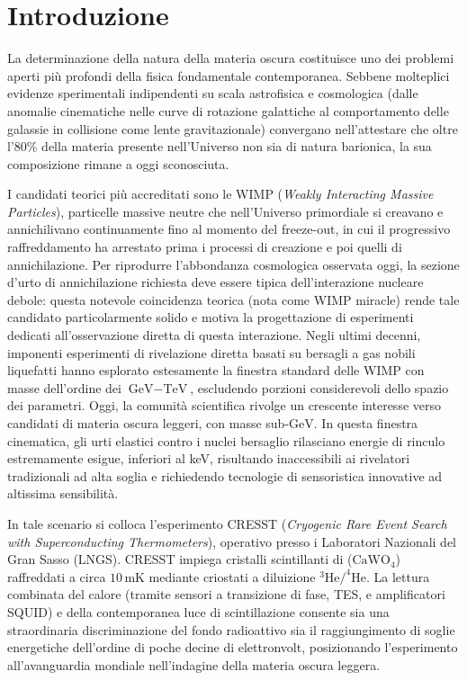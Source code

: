 \chapter*{Introduzione}

La determinazione della natura della materia oscura costituisce uno dei problemi aperti più profondi della fisica fondamentale contemporanea. Sebbene molteplici evidenze sperimentali indipendenti su scala astrofisica e cosmologica (dalle anomalie cinematiche nelle curve di rotazione galattiche al comportamento delle galassie in collisione come lente gravitazionale) convergano nell'attestare che oltre l'80\% della materia presente nell'Universo non sia di natura barionica, la sua composizione rimane a oggi sconosciuta.

I candidati teorici più accreditati sono le WIMP (\textit{Weakly Interacting Massive Particles}), particelle massive neutre che nell'Universo primordiale si creavano e annichilivano continuamente fino al momento del freeze-out, in cui il progressivo raffreddamento ha arrestato prima i processi di creazione e poi quelli di annichilazione. Per riprodurre l'abbondanza cosmologica osservata oggi, la sezione d'urto di annichilazione richiesta deve essere tipica dell'interazione nucleare debole: questa notevole coincidenza teorica (nota come WIMP miracle) rende tale candidato particolarmente solido e motiva la progettazione di esperimenti dedicati all'osservazione diretta di questa interazione. Negli ultimi decenni, imponenti esperimenti di rivelazione diretta basati su bersagli a gas nobili liquefatti hanno esplorato estesamente la finestra standard delle WIMP con masse dell'ordine dei $\text{GeV} - \text{TeV}$, escludendo porzioni considerevoli dello spazio dei parametri. Oggi, la comunità scientifica rivolge un crescente interesse verso candidati di materia oscura leggeri, con masse sub-$\text{GeV}$. In questa finestra cinematica, gli urti elastici contro i nuclei bersaglio rilasciano energie di rinculo estremamente esigue, inferiori al keV, risultando inaccessibili ai rivelatori tradizionali ad alta soglia e richiedendo tecnologie di sensoristica innovative ad altissima sensibilità.

In tale scenario si colloca l'esperimento CRESST (\textit{Cryogenic Rare Event Search with Superconducting Thermometers}), operativo presso i Laboratori Nazionali del Gran Sasso (LNGS). CRESST impiega cristalli scintillanti di ($\text{CaWO}_4$) raffreddati a circa $10\,\text{mK}$ mediante criostati a diluizione $^3\text{He}/^4\text{He}$. La lettura combinata del calore (tramite sensori a transizione di fase, TES, e amplificatori SQUID) e della contemporanea luce di scintillazione consente sia una straordinaria discriminazione del fondo radioattivo sia il raggiungimento di soglie energetiche dell'ordine di poche decine di elettronvolt, posizionando l'esperimento all'avanguardia mondiale nell'indagine della materia oscura leggera.

